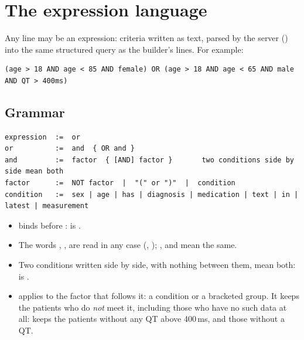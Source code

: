 \section{The expression language}
\label{sec:cohorts-expressions}

Any line may be an expression: criteria written as text, parsed by the server
() into the same structured query as the builder's lines. For
example:
\begin{lstlisting}[style=text]
(age > 18 AND age < 85 AND female) OR (age > 18 AND age < 65 AND male AND QT > 400ms)
\end{lstlisting}

\subsection{Grammar}
\label{sec:cohorts-grammar}

\begin{lstlisting}[style=text]
expression  :=  or
or          :=  and  { OR and }
and         :=  factor  { [AND] factor }       two conditions side by side mean both
factor      :=  NOT factor  |  "(" or ")"  |  condition
condition   :=  sex | age | has | diagnosis | medication | text | in | latest | measurement
\end{lstlisting}

\begin{itemize}
\item {} binds before :  is .
\item The words , ,  are read in any case (, );
  \code{\&\&}, \code{||} and \code{!} mean the same.
\item Two conditions written side by side, with nothing between them, mean both:
   is .
\item {} applies to the factor that follows it: a condition or a bracketed group. It
  keeps the patients who do \emph{not} meet it, including those who have no such data at all:
   keeps the patients without any QT above 400\,ms, and those without a QT.
\end{itemize}

